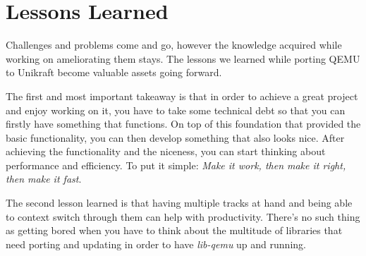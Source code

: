 \chapter{Lessons Learned}
\label{chapter:learnt-lessons}

Challenges and problems come and go, however the knowledge acquired while working on ameliorating them stays.
The lessons we learned while porting QEMU to Unikraft become valuable assets going forward.

The first and most important takeaway is that in order to achieve a great project and enjoy working on it, you have to take some technical debt so that you can firstly have something that functions.
On top of this foundation that provided the basic functionality, you can then develop something that also looks nice.
After achieving the functionality and the niceness, you can start thinking about performance and efficiency.
To put it simple: \textit{Make it work, then make it right, then make it fast}.

The second lesson learned is that having multiple tracks at hand and being able to context switch through them can help with productivity.
There's no such thing as getting bored when you have to think about the multitude of libraries that need porting and updating in order to have \textit{lib-qemu} up and running.
